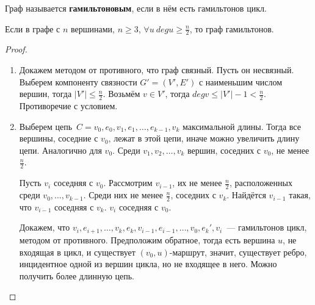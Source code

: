 \begin{definition}
	Граф называется \textbf{гамильтоновым}, если в нём есть гамильтонов цикл.
\end{definition}

\begin{theorem}[Дирака]
	Если в графе с $n$ вершинами, $n \geqslant 3$, $\forall u \ deg u \geqslant \frac{n}2$, то граф гамильтонов.
\end{theorem}
\begin{proof}
\begin{enumerate}
	\item Докажем методом от противного, что граф связный. Пусть он несвязный. Выберем компоненту
	связности $G' = (V', E')$ с наименьшим числом вершин, тогда $|V'| \leqslant \frac{n}2$.
	Возьмём $v \in V'$, тогда $deg v \leqslant |V'| - 1 < \frac{n}2$. Противоречие с условием.
	\item Выберем цепь~$C = v_0, e_0, v_1, e_1, \ldots, e_{k-1}, v_k$ максимальной длины. Тогда все вершины, соседние с $v_0$, лежат в этой цепи, иначе можно увеличить длину цепи. Аналогично для $v_0$. Среди $v_1, v_2, \ldots, v_k$ вершин, соседних с $v_0$, не менее $\frac{n}2$.
	
	Пусть $v_i$ соседняя с $v_0$. Рассмотрим $v_{i-1}$, их не менее $\frac{n}2$, расположенных среди $v_0, \ldots, v_{k-1}$. Среди них не менее $\frac{n}2$, соседних с $v_k$. Найдётся $v_{i-1}$ такая, что $v_{i-1}$ соседняя с $v_k$. $v_i$ соседняя с $v_0$.
	
	Докажем, что $v_i, e_{i+1}, \ldots, v_k, e_k, v_{i-1}, e_{i-1}, \ldots, v_0, e_k', v_i$~---
	гамильтонов цикл, методом от противного. Предположим обратное, тогда есть вершина $u$, не входящая в цикл, и существует $(v_0, u)$-маршрут, значит, существует ребро, инцидентное одной из вершин цикла, но не входящее в него. Можно получить более длинную цепь.
\end{enumerate}
\end{proof}